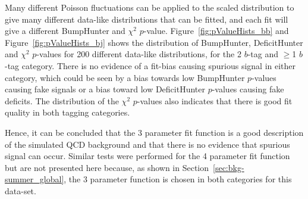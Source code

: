 Many different Poisson fluctuations can be applied to the scaled distribution to give many different data-like distributions that can be fitted,
and each fit will give a different BumpHunter and $\chi^{2}$ $p$-value.
Figure~\ref{fig:pValueHists_bb} and Figure~\ref{fig:pValueHists_bj} shows the distribution of BumpHunter, DeficitHunter and $\chi^{2}$ $p$-values for 200 different data-like distributions,
for the 2 $b$-tag and $\geq$1 $b$-tag category.
There is no evidence of a fit-bias causing spurious signal in either category,
which could be seen by a bias towards low BumpHunter $p$-values causing fake signals
or a bias toward low DeficitHunter $p$-values causing fake deficits.
The distribution of the $\chi^{2}$ $p$-values also indicates that there is good fit quality in both tagging categories.

Hence, it can be concluded that the 3 parameter fit function is a good description of the simulated QCD background
and that there is no evidence that spurious signal can occur.
Similar tests were performed for the 4 parameter fit function but are not presented here because,
as shown in Section~\ref{sec:bkg-summer_global},
the 3 parameter function is chosen in both categories for this data-set.

